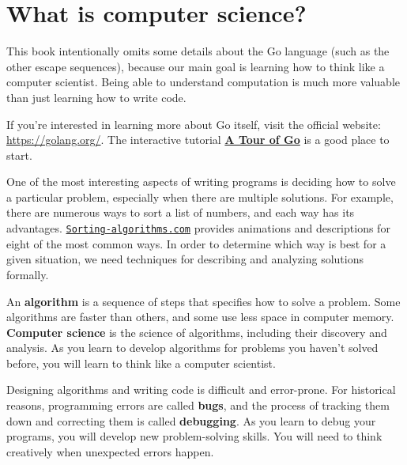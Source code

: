 
\section{What is computer science?}

This book intentionally omits some details about the Go language (such as the other escape sequences),
because our main goal is learning how to think like a computer scientist.
Being able to understand computation is much more valuable than just learning how to write code.

If you're interested in learning more about Go itself, visit the official website: \url{https://golang.org/}.
The interactive tutorial \href{https://tour.golang.org/welcome/1}{\bf A Tour of Go} is a good place to start.

One of the most interesting aspects of writing programs is deciding how to solve a particular problem, especially when there are multiple solutions.
For example, there are numerous ways to sort a list of numbers, and each way has its advantages.
\href{https://www.toptal.com/developers/sorting-algorithms/}{\tt Sorting-algorithms.com} provides animations and descriptions for eight of the most common ways.
In order to determine which way is best for a given situation, we need techniques for describing and analyzing solutions formally.


An {\bf algorithm} is a sequence of steps that specifies how to solve a problem.
Some algorithms are faster than others, and some use less space in computer memory.
{\bf Computer science} is the science of algorithms, including their discovery and analysis.
As you learn to develop algorithms for problems you haven't solved before, you will learn to think like a computer scientist.


Designing algorithms and writing code is difficult and error-prone.
For historical reasons, programming errors are called {\bf bugs}, and the process of tracking them down and correcting them is called {\bf debugging}.
As you learn to debug your programs, you will develop new problem-solving skills.
You will need to think creatively when unexpected errors happen.

